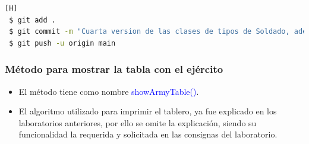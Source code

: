 \documentclass{article}
\begin{document}
\begin{lstlisting}[language=bash,caption={Commit \href{https://github.com/hernanchoquehuanca/fp2-23b/commit/bb6e2c8ae317d84675ff2d4305baad296aea1cd3}{bb6e2c8}: Dentro de este commit se adaptó el código para incluir el tema de los tipos de territorio y soldados.}][H]
 $ git add .
 $ git commit -m "Cuarta version de las clases de tipos de Soldado, ademas de modificar la clase principal (VideoJuego7.java)"
 $ git push -u origin main
\end{lstlisting}


\subsubsection{Método para mostrar la tabla con el ejército}
\begin{itemize}
    \item El método tiene como nombre \textcolor{blue}{showArmyTable()}.
    \item El algoritmo utilizado para imprimir el tablero, ya fue explicado en los laboratorios anteriores, por ello se omite la explicación, siendo su funcionalidad la requerida y solicitada en las consignas del laboratorio.
\end{itemize}

\end{document}

